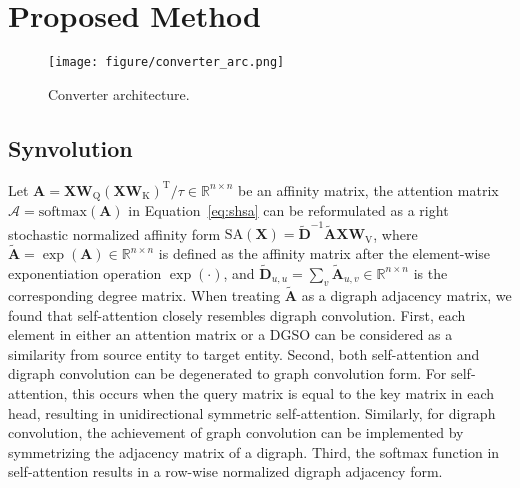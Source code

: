 \section{Proposed Method}
\begin{figure}[t]
\begin{center}
\texttt{[image: figure/converter\_arc.png]}
\end{center}
\caption{Converter architecture.}
\label{fig:converter_architecture}
\end{figure}

\subsection{Synvolution}
Let $\mathbf{A} = \mathbf{X}\mathbf{W}_{\text{Q}}(\mathbf{X}\mathbf{W}_{\text{K}})^{\mathrm{T}}/{\tau} \in \mathbb{R}^{n \times n}$ be an affinity matrix, the attention matrix $\mathcal{A} = \mathrm{softmax}(\mathbf{A})$ in Equation~\ref{eq:shsa} can be reformulated as a right stochastic normalized affinity form $\mathrm{SA}(\mathbf{X}) = \widetilde{\mathbf{D}}^{-1}\widetilde{\mathbf{A}}\mathbf{X}\mathbf{W}_{\text{V}}$, where $\widetilde{\mathbf{A}} = \exp(\mathbf{A}) \in \mathbb{R}^{n \times n}$ is defined as the affinity matrix after the element-wise exponentiation operation $\exp(\cdot)$, and $\widetilde{\mathbf{D}}_{u,u} = \sum_{v}\widetilde{\mathbf{A}}_{u,v} \in \mathbb{R}^{n \times n}$ is the corresponding degree matrix. When treating $\widetilde{\mathbf{A}}$ as a digraph adjacency matrix, we found that self-attention closely resembles digraph convolution. First, each element in either an attention matrix or a DGSO can be considered as a similarity from source entity to target entity. Second, both self-attention and digraph convolution can be degenerated to graph convolution form. For self-attention, this occurs when the query matrix is equal to the key matrix in each head, resulting in unidirectional symmetric self-attention. Similarly, for digraph convolution, the achievement of graph convolution can be implemented by symmetrizing the adjacency matrix of a digraph. Third, the softmax function in self-attention results in a row-wise normalized digraph adjacency form. 

